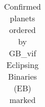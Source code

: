\begin{longtable}[!htbp]
{| 
 p{}| 
 p{}| 
 p{}| 
 p{}| 
 p{}| 
 p{}| 
 p{}| 
 p{}| 
 p{}| 
}
\caption{Confirmed planets ordered by GB\_vif Eclipsing Binaries (EB) marked}
\label{tab:GB_vif_RF_vif_LR_DT_EB}\\  %
\hline

\endhead


\end{longtable}
